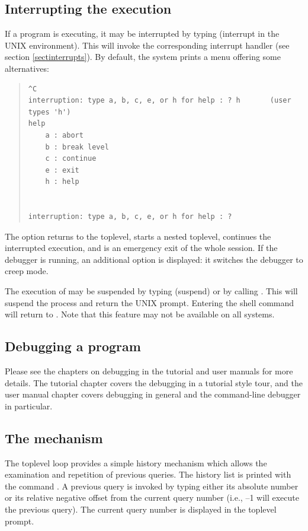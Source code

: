 \subsection{Interrupting the execution}

If a program is executing, it may be interrupted by
typing  (interrupt in the UNIX environment).
This will invoke the corresponding interrupt handler
(see section \ref{sectinterrupts}).
By default, the system prints a menu offering some alternatives:
\begin{quote}
\begin{verbatim}
^C
interruption: type a, b, c, e, or h for help : ? h       (user types 'h')
help
	a : abort
	b : break level
	c : continue
	e : exit
	h : help


interruption: type a, b, c, e, or h for help : ?
\end{verbatim}
\end{quote}
The  option returns to the toplevel,  starts a nested
toplevel,
 continues the interrupted execution, and  is an
emergency
exit
of the whole {\eclipse} session. If the debugger is running, an additional
option  is displayed: it switches the debugger to creep mode.

The execution of {\eclipse} may be suspended by typing 
(suspend) or by calling .
This will suspend the {\eclipse} process and return the UNIX prompt.
Entering the shell command  will return to {\eclipse}.
Note that this feature may not be available on all systems.

\subsection{Debugging a program}

Please see the chapters on debugging in the tutorial and user manuals for
more details. The tutorial chapter covers the {\tkeclipse} debugging in a
tutorial style tour, and the user manual chapter covers
 debugging in
general and the command-line debugger in particular.

\subsection{The  mechanism}
The {\eclipse} toplevel loop provides a simple history mechanism which allows
the examination and repetition of previous queries.
The history list is printed with the command .
A previous query is invoked by typing either its absolute number or its
relative negative offset from the current query number (i.e., --1 will
execute the previous query).
The current query number is displayed in the toplevel prompt.

